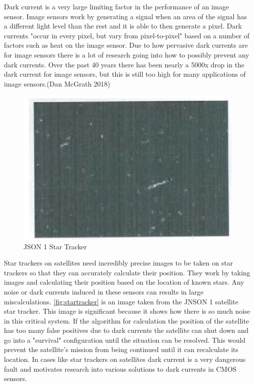 Dark current is a very large limiting factor in the performance of an image sensor.  Image sensors work by generating a signal when an area of the signal has a different light level than the rest and it is able to then generate a pixel.  Dark currents "occur in every pixel, but vary from pixel-to-pixel" based on a number of factors such as heat on the image sensor.  Due to how pervasive dark currents are for image sensors there is a lot of research going into how to possibly prevent any dark currents.  Over the past 40 years there has  been nearly a 5000x drop in the dark current for image sensors, but this is still too high for many applications of image sensors.(Dan McGrath 2018) 
\begin{figure}[h]
    \includegraphics[scale = 1.5]{assets/json star tracker.jpg}
    \caption{JSON 1 Star Tracker}
    \label{fig:startracker}
\end{figure}
Star trackers on satellites need incredibly precise images to be taken on star trackers so that they can accurately calculate their position.  They work by taking images and calculating their position based on the location of known stars.  Any noise or dark currents induced in these sensors can results in large miscalculations.  \autoref{fig:startracker} is an image taken from the JNSON 1 satellite star tracker.  This image is significant because it shows how there is so much noise in this critical system.  If the algorithm for calculation the position of the satellite has too many false positives due to dark currents the satellite can shut down and go into a "survival" configuration until the situation can be resolved.  This would prevent the satellite's mission from being continued until it can recalculate its location.  In cases like star trackers on satellites dark current is a very dangerous fault and motivates research into various solutions to dark currents in CMOS sensors.  